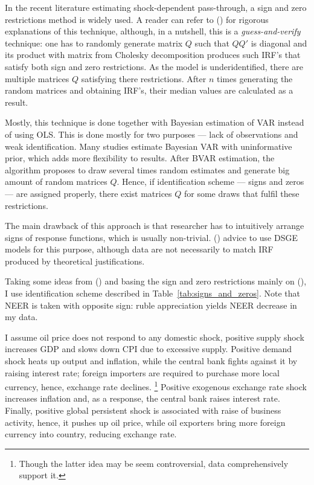 \documentclass[12pt, a4paper]{extarticle}
\begin{document}
In the recent literature estimating shock-dependent pass-through, a sign and zero restrictions method is widely used. A reader can refer to (\cite{Arias2014}) for rigorous explanations of this technique, although, in a nutshell, this is a \textit{guess-and-verify} technique: one has to randomly generate matrix $Q$ such that $QQ'$ is diagonal and its product with matrix from Cholesky decomposition produces such IRF's that satisfy both sign and zero restrictions. As the model is underidentified, there are multiple matrices $Q$ satisfying there restrictions. After $n$ times generating the random matrices and obtaining IRF's, their median values are calculated as a result. 

Mostly, this technique is done together with Bayesian estimation of VAR instead of using OLS. This is done mostly for two purposes --- lack of observations and weak identification. Many studies estimate Bayesian VAR with uninformative prior, which adds more flexibility to results. After BVAR estimation, the algorithm proposes to draw several times random estimates and generate big amount of random matrices $Q$. Hence, if identification scheme --- signs and zeros --- are assigned properly, there exist matrices $Q$ for some draws that fulfil these restrictions. 

The main drawback of this approach is that researcher has to intuitively arrange signs of response functions, which is usually non-trivial. (\cite{Ortega2020}) advice to use DSGE models for this purpose, although data are not necessarily to match IRF produced by theoretical justifications.

Taking some ideas from (\cite{An2020}) and basing the sign and zero restrictions mainly on (\cite{Forbes2018}), I use identification scheme described in Table~\ref{tab:signs_and_zeros}. Note that NEER is taken with opposite sign: ruble appreciation yields NEER decrease in my data.

I assume oil price does not respond to any domestic shock, positive supply shock increases GDP and slows down CPI due to excessive supply. Positive demand shock heats up output and inflation, while the central bank fights against it by raising interest rate; foreign importers are required to purchase more local currency, hence, exchange rate declines. \footnote{Though the latter idea may be seem controversial, data comprehensively support it.} Positive exogenous exchange rate shock increases inflation and, as a response, the central bank raises interest rate. Finally, positive global persistent shock is associated with raise of business activity, hence, it pushes up oil price, while oil exporters bring more foreign currency into country, reducing exchange rate.
\end{document}
